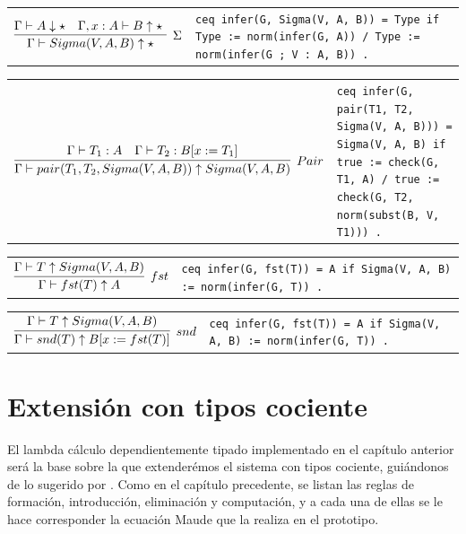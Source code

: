 \begin{center}
\begin{tabular}{@{}c@{\qquad}p{6cm}@{}}
  $\infer[\Sigma]
  {\Gamma \vdash Sigma(V, A, B) \uparrow \star }
  {\Gamma \vdash A \downarrow \star \quad \Gamma, x : A \vdash B \uparrow \star \ }$
  &
  \texttt{ceq infer(G, Sigma(V, A, B)) = Type
    if Type := norm(infer(G, A)) /\ Type := norm(infer(G ; V : A, B)) .} 
\end{tabular}
\end{center}

\begin{center}
\begin{tabular}{@{}c@{\qquad}p{6cm}@{}}
  $\infer[Pair]
  {\Gamma \vdash pair(T_1, T_2, Sigma(V, A, B)) \uparrow Sigma(V, A, B) }
  {\Gamma \vdash T_1 : A \quad \Gamma \vdash T_2 : B[ x := T_1]}$
  &
    \texttt{ceq infer(G, pair(T1, T2, Sigma(V, A, B))) = Sigma(V, A, B)
    if true := check(G, T1, A)
    /\ true := check(G, T2, norm(subst(B, V, T1))) .}
\end{tabular}
\end{center}


\begin{center}
\begin{tabular}{@{}c@{\qquad}p{6cm}@{}}
  $\infer[fst]
  {\Gamma \vdash fst(T) \uparrow A }
  {\Gamma \vdash T \uparrow Sigma(V, A, B)}$
  &
    \texttt{ceq infer(G, fst(T)) = A if Sigma(V, A, B) := norm(infer(G, T)) .}
\end{tabular}
\end{center}

\begin{center}
\begin{tabular}{@{}c@{\qquad}p{6cm}@{}}
  $\infer[snd]
  {\Gamma \vdash snd(T) \uparrow B[ x := fst(T)] }
  {\Gamma \vdash T \uparrow Sigma(V, A, B)}$
  &
    \texttt{ceq infer(G, fst(T)) = A if Sigma(V, A, B) := norm(infer(G, T)) .}
\end{tabular}
\end{center}

  
\chapter{Extensión con tipos cociente}\label{ch:quot}
El lambda cálculo dependientemente tipado implementado en el capítulo anterior
será la base sobre la que extenderémos el sistema con tipos cociente,
guiándonos de lo sugerido por \cite{nuoli}. Como en el capítulo precedente, se
listan las reglas de formación, introducción, eliminación y computación, y a
cada una de ellas se le hace corresponder la ecuación Maude que la realiza en el prototipo.

